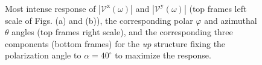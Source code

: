 \documentclass[prb,11pt,tightenlines,twocolumn,aps]{revtex4-1}
\begin{document}
\begin{figure}[t]
    \centering
    \\
    
    \caption{Most intense response of
    $|\mathcal{V}^{\mathrm{x}}(\omega)|$ and
    $|\mathcal{V}^{\mathrm{y}}(\omega)|$ (top frames left scale of Figs. (a) and
    (b)), the corresponding polar $\varphi$ and azimuthal $\theta$ angles (top
    frames right scale), and the corresponding three components (bottom frames)
    for the \emph{up} structure fixing the polarization angle to
    $\alpha=40^{\circ}$ to maximize the response.}
    \label{fig:up-vab-comp-rtp-1}
\end{figure}
\end{document}
